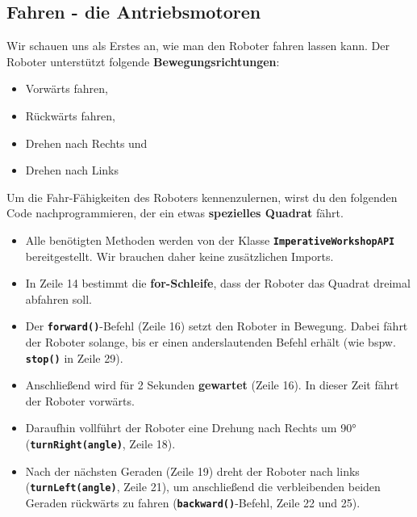 \documentclass[
	12pt,
	article,
	type=bsc, %
	colorbacktitle,
	instlogo,
	accentcolor=tud1c,
	german,
	twoside
]{tudexercise}
\newcommand{\solpath}[0]{../../impl/androidApp/app/src/main/java/org/mindroid/android/app/workshopSolutions}
\newcommand{\bfcode}[1]{\texttt{\textbf{#1}}}
\begin{document}
\subsection{Fahren - die Antriebsmotoren}
Wir schauen uns als Erstes an, wie man den Roboter fahren lassen kann. Der Roboter unterstützt folgende \textbf{Bewegungsrichtungen}:
\begin{itemize}
\item Vorwärts fahren,
\item Rückwärts fahren,
\item Drehen nach Rechts und
\item Drehen nach Links
\end{itemize}

Um die Fahr-Fähigkeiten des Roboters kennenzulernen, wirst du den folgenden Code nachprogrammieren, der ein etwas \textbf{spezielles Quadrat} fährt.



\begin{itemize}
\setlength{\itemsep}{0pt}
\item Alle benötigten Methoden werden von der Klasse \bfcode{ImperativeWorkshopAPI} bereitgestellt. Wir brauchen daher keine zusätzlichen Imports.
\item In Zeile 14 bestimmt die \textbf{for-Schleife}, dass der Roboter das Quadrat dreimal abfahren soll.
\item Der \bfcode{forward()}-Befehl (Zeile 16) setzt den Roboter in Bewegung. Dabei fährt der Roboter solange, bis er einen anderslautenden Befehl erhält (wie bspw. \bfcode{stop()} in Zeile 29).
\item Anschließend wird für 2 Sekunden \textbf{gewartet} (Zeile 16). In dieser Zeit fährt der Roboter vorwärts.
\item Daraufhin vollführt der Roboter eine Drehung nach Rechts um 90° (\bfcode{turnRight(angle)}, Zeile 18).
\item Nach der nächsten Geraden (Zeile 19) dreht der Roboter nach links (\bfcode{turnLeft(angle)}, Zeile 21), um anschließend die verbleibenden beiden Geraden rückwärts zu fahren (\bfcode{backward()}-Befehl, Zeile 22 und 25).

\end{itemize}
\end{document}

